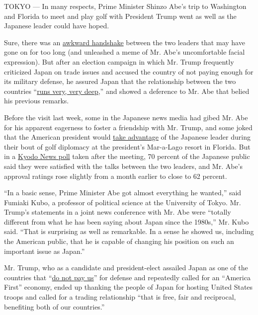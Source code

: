 TOKYO --- In many respects, Prime Minister Shinzo Abe's trip to
Washington and Florida to meet and play golf with President Trump went
as well as the Japanese leader could have hoped.

Sure, there was an
\href{https://www.youtube.com/watch?v=GWbP8eC-SIw\&feature=player_embedded}{awkward
handshake} between the two leaders that may have gone on for too long
(and unleashed a meme of Mr. Abe's uncomfortable facial expression). But
after an election campaign in which Mr. Trump frequently criticized
Japan on trade issues and accused the country of not paying enough for
its military defense, he assured Japan that the relationship between the
two countries
``\href{https://www.nytimes3xbfgragh.onion/2017/02/10/world/asia/trump-shinzo-abe-meeting.html?smid=tw-share}{runs
very, very deep},'' and showed a deference to Mr. Abe that belied his
previous remarks.

Before the visit last week, some in the Japanese news media had gibed
Mr. Abe for his apparent eagerness to foster a friendship with Mr.
Trump, and some joked that the American president would
\href{https://twitter.com/motokorich/status/829946184269656065}{take
advantage} of the Japanese leader during their bout of golf diplomacy at
the president's Mar-a-Lago resort in Florida. But in a
\href{http://english.kyodonews.jp/news/2017/02/458432.html}{Kyodo News
poll} taken after the meeting, 70 percent of the Japanese public said
they were satisfied with the talks between the two leaders, and Mr.
Abe's approval ratings rose slightly from a month earlier to close to 62
percent.

``In a basic sense, Prime Minister Abe got almost everything he
wanted,'' said Fumiaki Kubo, a professor of political science at the
University of Tokyo. Mr. Trump's statements in a joint news conference
with Mr. Abe were ``totally different from what he has been saying about
Japan since the 1980s,'' Mr. Kubo said. ``That is surprising as well as
remarkable. In a sense he showed us, including the American public, that
he is capable of changing his position on such an important issue as
Japan.''

Mr. Trump, who as a candidate and president-elect assailed Japan as one
of the countries that
``\href{https://www.nytimes3xbfgragh.onion/2016/09/27/us/politics/transcript-debate.html?_r=0}{do
not pay us}'' for defense and repeatedly called for an ``America First''
economy, ended up thanking the people of Japan for hosting United States
troops and called for a trading relationship ``that is free, fair and
reciprocal, benefiting both of our countries.''

